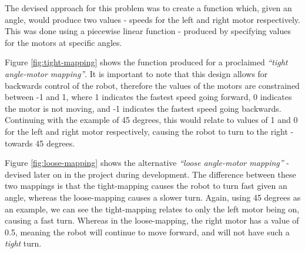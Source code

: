 \documentclass{l4proj}
\begin{document}
The devised approach for this problem was to create a function which, given an angle, would produce two values - speeds for the left and right motor respectively. This was done using a piecewise linear function - produced by specifying values for the motors at specific angles. 

Figure \ref{fig:tight-mapping} shows the function produced for a proclaimed \textit{“tight angle-motor mapping”}. It is important to note that this design allows for backwards control of the robot, therefore the values of the motors are constrained between -1 and 1, where 1 indicates the fastest speed going forward, 0 indicates the motor is not moving, and -1 indicates the fastest speed going backwards. Continuing with the example of 45 degrees, this would relate to values of 1 and 0 for the left and right motor respectively, causing the robot to turn to the right - towards 45 degrees. 

Figure \ref{fig:loose-mapping} shows the alternative \textit{“loose angle-motor mapping”} - devised later on in the project during development. The difference between these two mappings is that the tight-mapping causes the robot to turn fast given an angle, whereas the loose-mapping causes a slower turn. Again, using 45 degrees as an example, we can see the tight-mapping relates to only the left motor being on, causing a fast turn. Whereas in the loose-mapping, the right motor has a value of 0.5, meaning the robot will continue to move forward, and will not have such a \textit{tight} turn.
\end{document}
